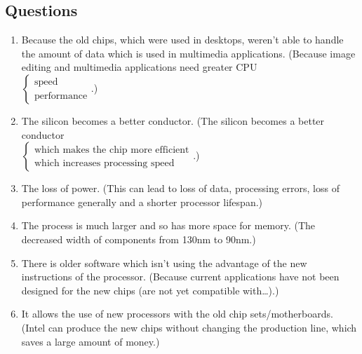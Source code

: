 \subsection{Questions}
\begin{enumerate}
\item Because the old chips, which were used in desktops, weren't able to handle the amount of data which is used in multimedia applications. (Because image editing and multimedia applications need greater CPU\\$\begin{cases}\text{speed}\\\text{performance}\end{cases}$.)
\item The silicon becomes a better conductor. (The silicon becomes a better conductor\\$\begin{cases}\text{which makes the chip more efficient}\\\text{which increases processing speed}\end{cases}$.)
\item The loss of power. (This can lead to loss of data, processing errors, loss of performance generally and a shorter processor lifespan.)
\item The process is much larger and so has more space for memory. (The decreased width of components from 130nm to 90nm.)
\item There is older software which isn't using the advantage of the new instructions of the processor. (Because current applications have not been designed for the new chips (are not yet compatible with\dots).)
\item It allows the use of new processors with the old chip sets/motherboards. (Intel can produce the new chips without changing the production line, which saves a large amount of money.)
\end{enumerate}
